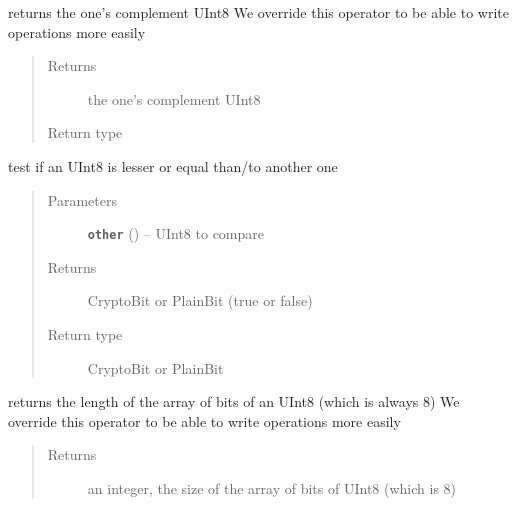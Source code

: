 \documentclass[letterpaper,10pt,english]{sphinxmanual}
\begin{document}
\begin{fulllineitems}

\begin{fulllineitems}
\label{datatypes.integers:datatypes.integers.UInt8.UInt8.__invert__}
returns the one's complement UInt8
We override this operator to be able to write operations more easily
\begin{quote}\begin{description}
\item[{Returns}] \leavevmode
the one's complement UInt8

\item[{Return type}] \leavevmode
{\hyperref[datatypes.integers:datatypes.integers.UInt8.UInt8]{}}

\end{description}\end{quote}

\end{fulllineitems}


\begin{fulllineitems}
\label{datatypes.integers:datatypes.integers.UInt8.UInt8.__le__}
test if an UInt8 is lesser or equal than/to another one
\begin{quote}\begin{description}
\item[{Parameters}] \leavevmode
\textbf{\texttt{other}} ({\hyperref[datatypes.integers:datatypes.integers.UInt8.UInt8]{}}) -- UInt8 to compare

\item[{Returns}] \leavevmode
CryptoBit or PlainBit (true or false)

\item[{Return type}] \leavevmode
CryptoBit or PlainBit

\end{description}\end{quote}

\end{fulllineitems}


\begin{fulllineitems}
\label{datatypes.integers:datatypes.integers.UInt8.UInt8.__len__}
returns the length of the array of bits of an UInt8 (which is always 8)
We override this operator to be able to write operations more easily
\begin{quote}\begin{description}
\item[{Returns}] \leavevmode
an integer, the size of the array of bits of UInt8 (which is 8)


\end{description}
\end{quote}
\end{fulllineitems}
\end{fulllineitems}
\end{document}
